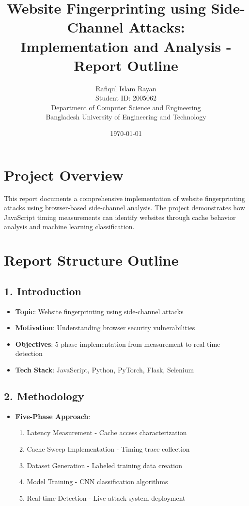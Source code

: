 \documentclass[11pt,a4paper]{article}
\title{\textbf{Website Fingerprinting using Side-Channel Attacks:\\
Implementation and Analysis - Report Outline}}
\author{
    Rafiqul Islam Rayan \\
    Student ID: 2005062 \\
    Department of Computer Science and Engineering \\
    Bangladesh University of Engineering and Technology
}
\date{\today}
\begin{document}
\maketitle

\section*{Project Overview}

This report documents a comprehensive implementation of website fingerprinting attacks using browser-based side-channel analysis. The project demonstrates how JavaScript timing measurements can identify websites through cache behavior analysis and machine learning classification.

\section{Report Structure Outline}

\subsection{1. Introduction}
\begin{itemize}[leftmargin=*]
    \item \textbf{Topic}: Website fingerprinting using side-channel attacks
    \item \textbf{Motivation}: Understanding browser security vulnerabilities
    \item \textbf{Objectives}: 5-phase implementation from measurement to real-time detection
    \item \textbf{Tech Stack}: JavaScript, Python, PyTorch, Flask, Selenium
\end{itemize}

\subsection{2. Methodology}
\begin{itemize}[leftmargin=*]
    \item \textbf{Five-Phase Approach}:
    \begin{enumerate}
        \item Latency Measurement - Cache access characterization
        \item Cache Sweep Implementation - Timing trace collection  
        \item Dataset Generation - Labeled training data creation
        \item Model Training - CNN classification algorithms
        \item Real-time Detection - Live attack system deployment
    \end{enumerate}
\end{itemize}
\end{document}
